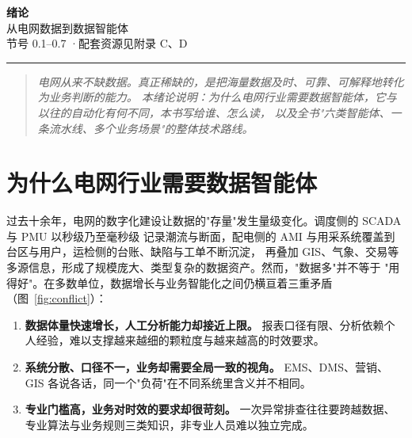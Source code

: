 \documentclass[UTF8,a4paper,12pt]{ctexart}
\begin{document}
\begin{center}
  {\Huge\bfseries\color{primary} 绪论}\\[0.35em]
  {\LARGE\color{accent} 从电网数据到数据智能体}\\[0.8em]
  {\small\color{gray} 节号 0.1--0.7 \quad·\quad 配套资源见附录 C、D}
\end{center}

\vspace{0.4em}
\hrule
\vspace{1.0em}

\begin{quote}
\itshape
电网从来不缺数据。真正稀缺的，是把海量数据及时、可靠、可解释地转化为业务判断的能力。
本绪论说明：为什么电网行业需要数据智能体，它与以往的自动化有何不同，本书写给谁、怎么读，
以及全书"六类智能体、一条流水线、多个业务场景"的整体技术路线。
\end{quote}

\section{为什么电网行业需要数据智能体}

过去十余年，电网的数字化建设让数据的"存量"发生量级变化。调度侧的 SCADA 与 PMU 以秒级乃至毫秒级
记录潮流与断面，配电侧的 AMI 与用采系统覆盖到台区与用户，运检侧的台账、缺陷与工单不断沉淀，
再叠加 GIS、气象、交易等多源信息，形成了规模庞大、类型复杂的数据资产。然而，"数据多"并不等于
"用得好"。在多数单位，数据增长与业务智能化之间仍横亘着三重矛盾（图~\ref{fig:conflict}）：

\begin{enumerate}[leftmargin=2em,itemsep=2pt]
  \item \textbf{数据体量快速增长，人工分析能力却接近上限。}
        报表口径有限、分析依赖个人经验，难以支撑越来越细的颗粒度与越来越高的时效要求。
  \item \textbf{系统分散、口径不一，业务却需要全局一致的视角。}
        EMS、DMS、营销、GIS 各说各话，同一个"负荷"在不同系统里含义并不相同。
  \item \textbf{专业门槛高，业务对时效的要求却很苛刻。}
        一次异常排查往往要跨越数据、专业算法与业务规则三类知识，非专业人员难以独立完成。
\end{enumerate}
\end{document}
